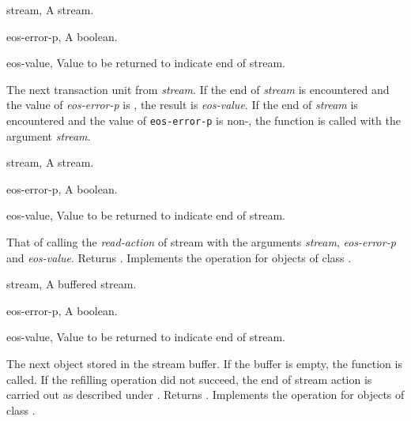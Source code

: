 \begin{optDefinition}
\begin{genericargs}
    \item[stream, \classref{stream}] A stream.
    \item[eos-error-p, \classref{object}] A boolean.
    \item[eos-value, \classref{object}] Value to be returned to indicate end of
    stream.
\end{genericargs}
%
\result%
The next transaction unit from {\em stream}.
%
\remarks If the end of {\em stream\/} is encountered and the value of {\em
    eos-error-p} is \nil, the result is {\em eos-value\/}. If the end of {\em
    stream} is encountered and the value of {\tt eos-error-p} is non-\nil,
the function  is called with the argument {\em
    stream}.

\begin{specargs}
    \item[stream, \classref{stream}] A stream.
    \item[eos-error-p, \classref{object}] A boolean.
    \item[eos-value, \classref{object}] Value to be returned to indicate end of
    stream.
\end{specargs}
%
\result%
That of calling the {\em read-action\/} of stream with the arguments {\em stream\/},
{\em eos-error-p\/} and {\em eos-value}.  Returns \true.
%
\remarks%
Implements the  operation for objects of class
.

\begin{specargs}
    \item[stream, \classref{buffered-stream}] A buffered stream.
    \item[eos-error-p, \classref{object}] A boolean.
    \item[eos-value, \classref{object}] Value to be returned to indicate end of
    stream.
\end{specargs}
%
\result%
The next object stored in the stream buffer.  If the buffer is empty,
the function  is called. If the refilling operation did
not succeed, the end of stream action is carried out as described under
.  Returns \true.
%
\remarks%
Implements the  operation for objects of class
.


\end{optDefinition}
